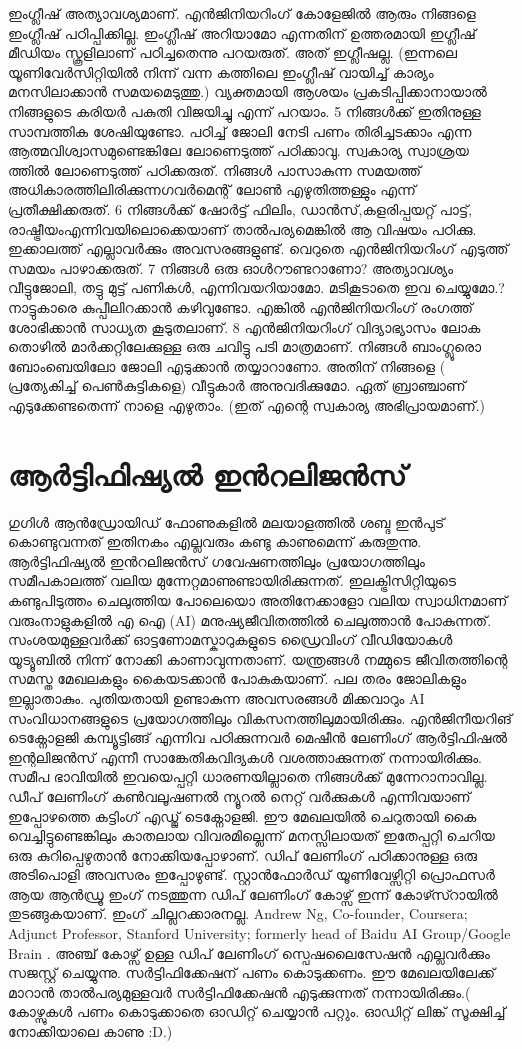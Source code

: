 \documentclass[10pt,a4paper]{report}
\begin{document}
ഇംഗ്ലീഷ് അത്യാവശ്യമാണ്. എൻജിനിയറിംഗ് കോളേജിൽ ആരും നിങ്ങളെ ഇംഗ്ലീഷ് പഠിപ്പിക്കില്ല. ഇംഗ്ലീഷ് അറിയാമോ എന്നതിന് ഉത്തരമായി ഇഗ്ലീഷ് മീഡിയം സ്കൂളിലാണ് പഠിച്ചതെന്നു പറയരുത്. അത് ഇഗ്ലീഷല്ല. (ഇന്നലെ യൂണിവേർസിറ്റിയിൽ നിന്ന് വന്ന കത്തിലെ ഇംഗ്ലീഷ് വായിച്ച് കാര്യം മനസിലാക്കാൻ സമയമെടുത്തു.) വ്യക്തമായി ആശയം പ്രകടിപ്പിക്കാനായാൽ നിങ്ങളുടെ കരിയർ പകുതി വിജയിച്ചു എന്ന് പറയാം. 5 നിങ്ങൾക്ക് ഇതിനുള്ള സാമ്പത്തിക ശേഷിയുണ്ടോ. പഠിച്ച് ജോലി നേടി പണം തിരിച്ചടക്കാം എന്ന ആത്മവിശ്വാസമുണ്ടെങ്കിലേ ലോണെടുത്ത് പഠിക്കാവു. സ്വകാര്യ സ്വാശ്രയ ത്തിൽ ലോണെടുത്ത് പഠിക്കരുത്. നിങ്ങൾ പാസാകുന്ന സമയത്ത് അധികാരത്തിലിരിക്കുന്നഗവർമെന്റ് ലോൺ എഴുതിത്തള്ളും എന്ന് പ്രതീക്ഷിക്കരുത്. 6 നിങ്ങൾക്ക് ഷോർട്ട് ഫിലിം, ഡാൻസ്,കളരിപ്പയറ്റ് പാട്ട്, രാഷ്ട്രീയംഎന്നിവയിലൊക്കെയാണ് താൽപര്യമെങ്കിൽ ആ വിഷയം പഠിക്കു. ഇക്കാലത്ത് എല്ലാവർക്കും അവസരങ്ങളുണ്ട്. വെറുതെ എൻജിനിയറിംഗ് എടുത്ത് സമയം പാഴാക്കരുത്. 7 നിങ്ങൾ ഒരു ഓൾറൗണ്ടറാണോ? അത്യാവശ്യം വീട്ടുജോലി, തട്ടു മുട്ട് പണികൾ, എന്നിവയറിയാമോ. മടികൂടാതെ ഇവ ചെയ്യുമോ.?നാട്ടുകാരെ കുപ്പീലിറക്കാൻ കഴിവുണ്ടോ. എങ്കിൽ എൻജിനിയറിംഗ് രംഗത്ത് ശോഭിക്കാൻ സാധ്യത കൂടുതലാണ്. 8 എൻജിനിയറിംഗ് വിദ്യാഭ്യാസം ലോക തൊഴിൽ മാർക്കറ്റിലേക്കുള്ള ഒരു ചവിട്ടു പടി മാത്രമാണ്. നിങ്ങൾ ബാംഗ്ലൂരൊ ബോംബെയിലോ ജോലി എടുക്കാൻ തയ്യാറാണോ. അതിന് നിങ്ങളെ ( പ്രത്യേകിച്ച് പെൺകുട്ടികളെ) വീട്ടുകാർ അനുവദിക്കുമോ. ഏത് ബ്രാഞ്ചാണ് എടുക്കേണ്ടതെന്ന് നാളെ എഴുതാം. (ഇത് എന്റെ സ്വകാര്യ അഭിപ്രായമാണ്‌.)
  
 \section{ആർട്ടിഫിഷ്യൽ ഇൻറലിജൻസ്} 
  ഗുഗിൾ ആൻഡ്രോയിഡ് ഫോണുകളിൽ മലയാളത്തിൽ ശബ്ദ ഇൻപുട് കൊണ്ടുവന്നത് ഇതിനകം എല്ലവരും കണ്ടു കാണുമെന്ന് കരുതുന്നു. ആർട്ടിഫിഷ്യൽ ഇൻറലിജൻസ് ഗവേഷണത്തിലും പ്രയോഗത്തിലും സമീപകാലത്ത് വലിയ മുന്നേറ്റമാണുണ്ടായിരിക്കുന്നത്. ഇലക്ട്രിസിറ്റിയുടെ കണ്ടുപിടുത്തം ചെലുത്തിയ പോലെയൊ അതിനേക്കാളോ വലിയ സ്വാധിനമാണ് വരുംനാളുകളിൽ എ ഐ (AI) മനുഷ്യജീവിതത്തിൽ ചെലുത്താൻ പോകുന്നത്. സംശയമുള്ളവർക്ക് ഓട്ടണോമസ്കാറുകളുടെ ഡ്രൈവിംഗ് വീഡിയോകൾ യൂട്യൂബിൽ നിന്ന് നോക്കി കാണാവുന്നതാണ്. യന്ത്രങ്ങൾ നമ്മുടെ ജീവിതത്തിന്റെ സമസ്ത മേഖലകളും കൈയടക്കാൻ പോകുകയാണ്. പല തരം ജോലികളും ഇല്ലാതാകും. പുതിയതായി ഉണ്ടാകുന്ന അവസരങ്ങൾ മിക്കവാറും AI സംവിധാനങ്ങളുടെ പ്രയോഗത്തിലും വികസനത്തിലുമായിരിക്കും. എൻജിനീയറിങ് ടെക്നോളജി കമ്പ്യൂട്ടിങ്ങ് എന്നിവ പഠിക്കുന്നവർ മെഷീൻ ലേണിംഗ് ആർട്ടിഫിഷൽ ഇന്റലിജൻസ് എന്നീ സാങ്കേതികവിദ്യകൾ വശത്താക്കുന്നത് നന്നായിരിക്കും. സമീപ ഭാവിയിൽ ഇവയെപ്പറ്റി ധാരണയില്ലാതെ നിങ്ങൾക്ക് മുന്നേറാനാവില്ല. ഡീപ് ലേണിംഗ് കൺവലൂഷണൽ ന്യൂറൽ നെറ്റ് വർക്കുകൾ എന്നിവയാണ് ഇപ്പോഴത്തെ കട്ടിംഗ് എഡ്ജ് ടെക്നോളജി. ഈ മേഖലയിൽ ചെറുതായി കൈ വെച്ചിട്ടുണ്ടെങ്കിലും കാതലായ വിവരമില്ലെന്ന് മനസ്സിലായത് ഇതേപ്പറ്റി ചെറിയ ഒരു കുറിപ്പെഴുതാൻ നോക്കിയപ്പോഴാണ്. ഡിപ് ലേണിംഗ് പഠിക്കാനുള്ള ഒരു അടിപൊളി അവസരം ഇപ്പോഴുണ്ട്. സ്റ്റാൻഫോർഡ് യൂണിവേഴ്സിറ്റി പ്രൊഫസർ ആയ ആൻഡ്രൂ ഇംഗ് നടത്തുന്ന ഡിപ് ലേണിംഗ് കോഴ്സ് ഇന്ന് കോഴ്സ്റായിൽ തുടങ്ങുകയാണ്. ഇംഗ് ചില്ലറക്കാരനല്ല. Andrew Ng, Co-founder, Coursera; Adjunct Professor, Stanford University; formerly head of Baidu AI Group/Google Brain . അഞ്ച് കോഴ്സ് ഉള്ള ഡിപ് ലേണിംഗ് സ്പെഷലൈസേഷൻ എല്ലവർക്കും സജസ്റ്റ് ചെയ്യുന്നു. സർട്ടിഫിക്കേഷന് പണം കൊടുക്കണം. ഈ മേഖലയിലേക്ക് മാറാൻ താൽപര്യമുള്ളവർ സർട്ടിഫിക്കേഷൻ എടുക്കുന്നത് നന്നായിരിക്കും.( കോഴ്സുകൾ പണം കൊടുക്കാതെ ഓഡിറ്റ് ചെയ്യാൻ പറ്റും. ഓഡിറ്റ് ലിങ്ക് സൂക്ഷിച്ച് നോക്കിയാലെ കാണു :D.)
  
\end{document}
